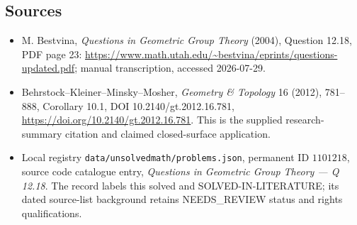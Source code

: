 \documentclass[11pt]{article}
\begin{document}
\subsection{Sources}
\begin{itemize}
\item M. Bestvina, \emph{Questions in Geometric Group Theory} (2004), Question 12.18, PDF page 23: \url{https://www.math.utah.edu/~bestvina/eprints/questions-updated.pdf}; manual transcription, accessed 2026-07-29.
\item Behrstock--Kleiner--Minsky--Mosher, \emph{Geometry \& Topology} 16 (2012), 781--888, Corollary 10.1, DOI 10.2140/gt.2012.16.781, \url{https://doi.org/10.2140/gt.2012.16.781}. This is the supplied research-summary citation and claimed closed-surface application.
\item Local registry \texttt{data/unsolvedmath/problems.json}, permanent ID $1101218$, source code catalogue entry, \emph{Questions in Geometric Group Theory --- Q 12.18}. The record labels this solved and SOLVED-IN-LITERATURE; its dated source-list background retains NEEDS\_REVIEW status and rights qualifications.
\end{itemize}
\end{document}
